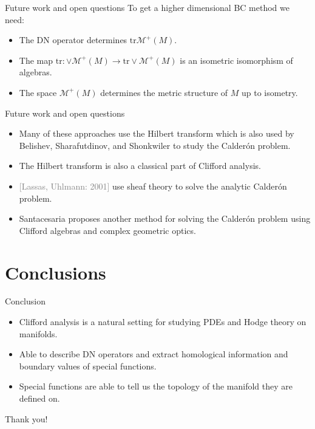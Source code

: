 \documentclass[aspectratio=169,handout]{beamer}
\newcommand\grey[1]{\textcolor{gray}{#1}}
\newcommand{\trace}{\mathrm{tr}}
\newcommand{\monogenics}{\mathcal{M}}
\begin{document}
\begin{frame}{Future work and open questions}
\vfill
To get a higher dimensional BC method we need:
\begin{itemize}
  \item The DN operator determines $\trace \monogenics^+(M)$.
  \item The map $\trace \colon \vee \monogenics^+(M) \to \trace \vee \monogenics^+(M)$ is an isometric isomorphism of algebras.
  \item The space $\monogenics^+(M)$ determines the metric structure of $M$ up to isometry.
\end{itemize}
\vfill
\end{frame}


\begin{frame}{Future work and open questions}
\vfill
\begin{itemize}
  \item Many of these approaches use the Hilbert transform which is also used by Belishev, Sharafutdinov, and Shonkwiler to study the Calder\'on problem.
  \item The Hilbert transform is also a classical part of Clifford analysis.
  \item \grey{[Lassas, Uhlmann: 2001]} use sheaf theory to solve the analytic Calder\'on problem.
  \item Santacesaria proposes another method for solving the Calder\'on problem using Clifford algebras and complex geometric optics.
\end{itemize}
\vfill
\end{frame}

\section{Conclusions}

\begin{frame}{Conclusion}
\vfill
\begin{itemize}
\pause
    \item Clifford analysis is a natural setting for studying PDEs and Hodge theory on manifolds.
\pause
    \item Able to describe DN operators and extract homological information and boundary values of special functions.
\pause
    \item Special functions are able to tell us the topology of the manifold they are defined on.
\end{itemize}
\vfill
\end{frame}


\begin{frame}{}
\vfill
\begin{center}
\large Thank you!
\end{center}
\vfill
\end{frame}
\end{document}
